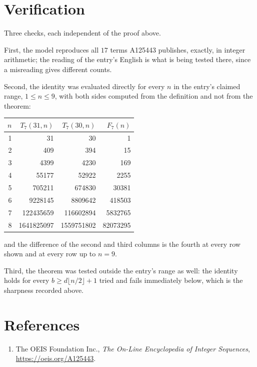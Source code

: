 \documentclass[11pt,a4paper]{article}
\theoremstyle{plain}
\theoremstyle{definition}
\begin{document}
\section{Verification}

Three checks, each independent of the proof above.

First, the model reproduces all $17$ terms A125443 publishes, exactly, in integer
arithmetic; the reading of the entry's English is what is being tested there, since a
misreading gives different counts.

Second, the identity was evaluated directly for every $n$ in the entry's claimed range,
$1\le n\le9$, with both sides computed from the definition and not from the theorem:

\begin{center}
\begin{tabular}{rrrr}
$n$ & $T_{7}(31,n)$ & $T_{7}(30,n)$ & $F_{7}(n)$ \\ \hline
1 & 31 & 30 & 1 \\
2 & 409 & 394 & 15 \\
3 & 4399 & 4230 & 169 \\
4 & 55177 & 52922 & 2255 \\
5 & 705211 & 674830 & 30381 \\
6 & 9228145 & 8809642 & 418503 \\
7 & 122435659 & 116602894 & 5832765 \\
8 & 1641825097 & 1559751802 & 82073295 \\
\end{tabular}
\end{center}

\noindent and the difference of the second and third columns is the fourth at every row shown
and at every row up to $n=9$.

Third, the theorem was tested outside the entry's range as well: the identity holds for every
$b\ge d\lfloor n/2\rfloor+1$ tried and fails immediately below, which is the sharpness recorded
above.

\section*{References}
\begin{enumerate}
\item The OEIS Foundation Inc., \emph{The On-Line Encyclopedia of Integer Sequences},
\url{https://oeis.org/A125443}.
\end{enumerate}
\end{document}

